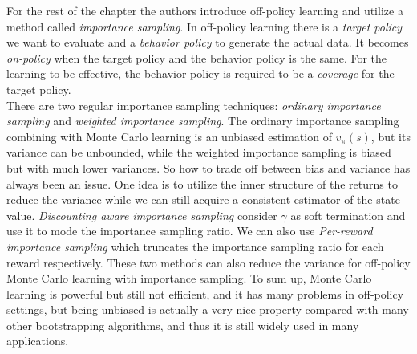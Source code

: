 \documentclass[12pt,a4paper]{article}
\begin{document}
For the rest of the chapter the authors introduce off-policy learning and utilize a method called \textit{importance sampling}. In off-policy learning there is a \textit{target policy} we want to evaluate and a \textit{behavior policy} to generate the actual data. It becomes \textit{on-policy} when the target policy and the behavior policy is the same. For the learning to be effective, the behavior policy is required to be a \textit{coverage} for the target policy.\\

There are two regular importance sampling techniques: \textit{ordinary importance sampling} and \textit{weighted importance sampling}. The ordinary importance sampling combining with Monte Carlo learning is an unbiased estimation of $v_{\pi}(s)$, but its variance can be unbounded, while the weighted importance sampling is biased but with much lower variances. So how to trade off between bias and variance has always been an issue. One idea is to utilize the inner structure of the returns to reduce the variance while we can still acquire a consistent estimator of the state value. \textit{Discounting aware importance sampling} consider $\gamma$ as soft termination and use it to mode the importance sampling ratio. We can also use \textit{Per-reward importance sampling} which truncates the importance sampling ratio for each reward respectively. These two methods can also reduce the variance for off-policy Monte Carlo learning with importance sampling. To sum up, Monte Carlo learning is powerful but still not efficient, and it has many problems in off-policy settings, but being unbiased is actually a very nice property compared with many other bootstrapping algorithms, and thus it is still widely used in many applications.  
\end{document}
